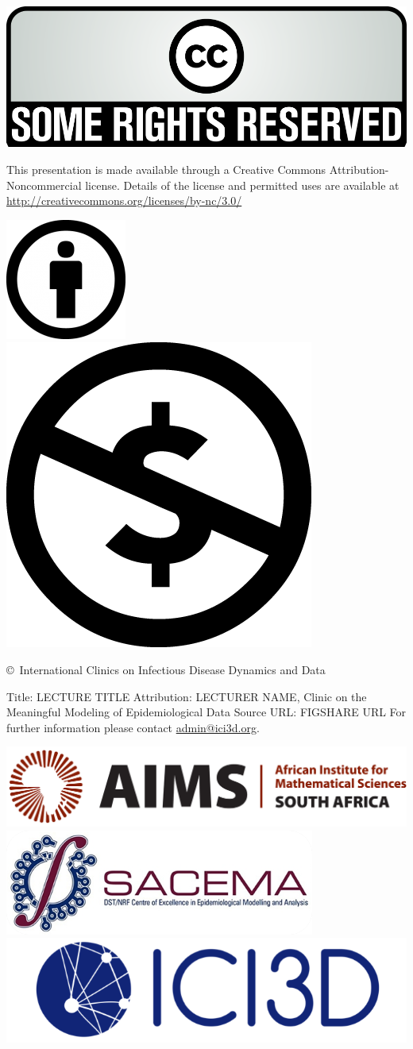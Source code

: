 
\begin{frame}[plain]

\begin{centering}

\includegraphics[height=6ex]{rights.png}

\vfill

{
	\tiny\linespread{12}
	This presentation is made available through a Creative Commons Attribution-Noncommercial license.
	Details of the license and permitted uses are available at \url{http://creativecommons.org/licenses/by-nc/3.0/} \par
}

\medskip
\includegraphics[height=3ex]{attrib.png}
\hspace{3em}
\includegraphics[height=3ex]{noncom.png}
\medskip

{\tiny\copyright\years\ International Clinics on Infectious Disease Dynamics and Data}

\vfill

Title: {LECTURE TITLE}
Attribution: {LECTURER NAME}, Clinic on the Meaningful Modeling of Epidemiological Data
Source URL: {FIGSHARE URL}
For further information please contact \url{admin@ici3d.org}.

\vfill

\includegraphics[height=3ex]{AIMS.jpg}
\includegraphics[height=3ex]{sacema.png}
\includegraphics[height=3ex]{ICI3D_logo.png}

\end{centering}

\end{frame}
